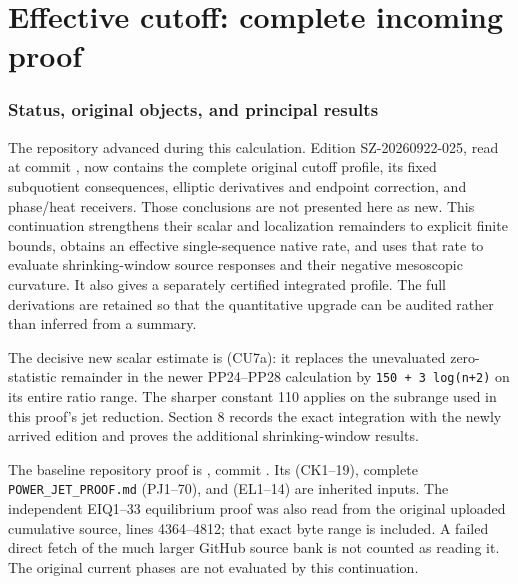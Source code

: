 \documentclass[10pt]{article}
\begin{document}
\clearpage\part{Effective cutoff: complete incoming proof}
\section{Status, original objects, and principal results}\label{status-original-objects-and-principal-results}

The repository advanced during this calculation. Edition SZ-20260922-025, read at commit , now contains the complete original cutoff profile, its fixed subquotient consequences, elliptic derivatives and endpoint correction, and phase/heat receivers. Those conclusions are not presented here as new. This continuation strengthens their scalar and localization remainders to explicit finite bounds, obtains an effective single-sequence native rate, and uses that rate to evaluate shrinking-window source responses and their negative mesoscopic curvature. It also gives a separately certified integrated profile. The full derivations are retained so that the quantitative upgrade can be audited rather than inferred from a summary.

The decisive new scalar estimate is (CU7a): it replaces the unevaluated zero-statistic remainder in the newer PP24--PP28 calculation by \texttt{150\ +\ 3\ log(n+2)} on its entire ratio range. The sharper constant 110 applies on the subrange used in this proof's jet reduction. Section 8 records the exact integration with the newly arrived edition and proves the additional shrinking-window results.

The baseline repository proof is , commit . Its  (CK1--19), complete \texttt{POWER\_JET\_PROOF.md} (PJ1--70), and  (EL1--14) are inherited inputs. The independent EIQ1--33 equilibrium proof was also read from the original uploaded cumulative source, lines 4364--4812; that exact byte range is included. A failed direct fetch of the much larger GitHub source bank is not counted as reading it. The original current phases are not evaluated by this continuation.
\end{document}
